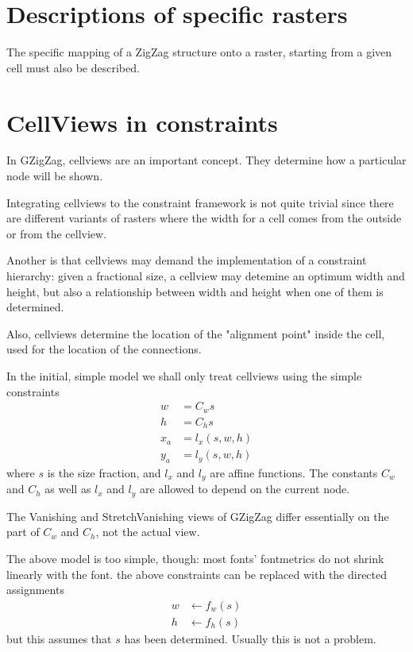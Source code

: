 \documentclass[a4paper]{article}
\begin{document}
\section{Descriptions of specific rasters}

The specific mapping of a ZigZag structure onto a raster,
starting from a given cell must also be described.


\section{CellViews in constraints}

In GZigZag, cellviews are an important concept. They determine
how a particular node will be shown.

Integrating cellviews to the constraint framework is not quite trivial
since there are different variants of rasters where the width for a cell
comes from the outside or from the cellview.

Another is that cellviews may demand the implementation of a constraint
hierarchy: given a fractional size, a cellview may detemine an optimum
width and height, but also a relationship between width and height
when one of them is determined.

Also, cellviews determine the location of the "alignment point" inside
the cell, used for the location of the connections.

In the initial, simple model we shall only treat cellviews using the
simple constraints
\begin{align}
	w &= C_w s \\
	h &= C_h s \\
	x_a &= l_x(s, w, h) \\
	y_a &= l_y(s, w, h) 
\end{align}
where $s$ is the size fraction, and $l_x$ and $l_y$ are 
affine functions. The constants $C_w$ and $C_h$ as well as $l_x$ and $l_y$
are allowed to depend on the current node.

The Vanishing and StretchVanishing views of GZigZag differ essentially
on the part of $C_w$ and $C_h$, not the actual view.

The above model is too simple, though: most fonts' fontmetrics
do not shrink linearly with the font. the above constraints
can be replaced with the directed assignments
\begin{align}
	w &\leftarrow f_w(s) \\
	h &\leftarrow f_h(s) 
\end{align}
but this assumes that $s$ has been determined. Usually this is not a problem.
\end{document}
